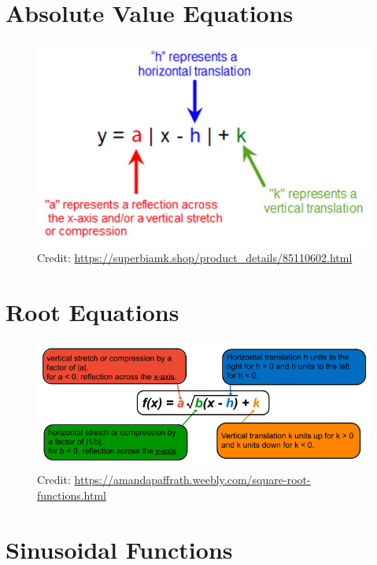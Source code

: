 \documentclass[12pt]{article}
\begin{document}
\section{Absolute Value Equations}

\begin{figure}[H]
	\centering
	\includegraphics[width=\textwidth]{Absolute Value Equations Image.gif}
	\caption{Credit: \url{https://superbiamk.shop/product_details/85110602.html}}
\end{figure}

\section{Root Equations}

\begin{figure}[H]
	\centering
	\includegraphics[width=\textwidth]{Root Functions Screenshot Aug 26.png}
	\caption{Credit: \url{https://amandapaffrath.weebly.com/square-root-functions.html}}
\end{figure}

\section{Sinusoidal Functions}
\end{document}
